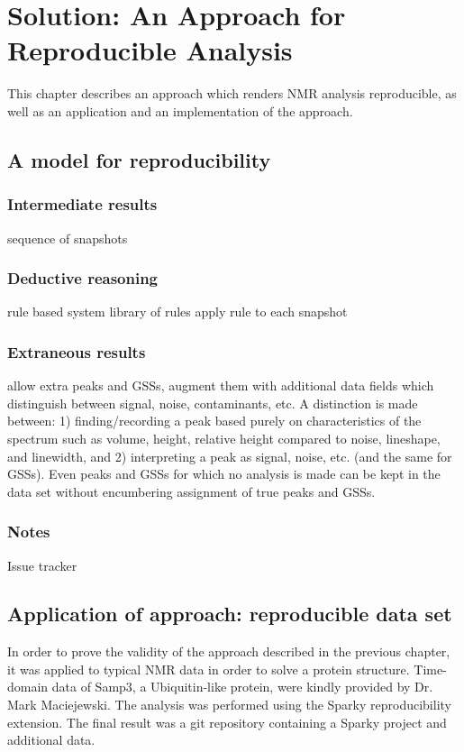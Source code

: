 \chapter{Solution: An Approach for Reproducible Analysis}

This chapter describes an approach which renders NMR analysis reproducible,
as well as an application and an implementation of the approach.



\section{A model for reproducibility}

\subsection{Intermediate results}
sequence of snapshots

\subsection{Deductive reasoning}
rule based system
library of rules
apply rule to each snapshot

\subsection{Extraneous results}
allow extra peaks and GSSs, augment them with additional data fields which distinguish between signal, 
noise, contaminants, etc.  A distinction is made 
between: 1) finding/recording a peak based purely on characteristics of 
the spectrum such as volume, height, relative height compared to noise, 
lineshape, and linewidth, and 2) interpreting a peak as signal, noise, 
etc. (and the same for GSSs).  Even peaks and GSSs for 
which no analysis is made can be kept in the data set without encumbering 
assignment of true peaks and GSSs.

\subsection{Notes}
Issue tracker



\section{Application of approach: reproducible data set}
In order to prove the validity of the approach described in the previous chapter, 
it was applied to typical NMR data in order to solve a protein structure.
Time-domain data of Samp3, a Ubiquitin-like protein, were kindly provided by 
Dr. Mark Maciejewski.  The analysis was performed using the Sparky reproducibility
extension.  The final result was a git repository containing a Sparky project
and additional data.



